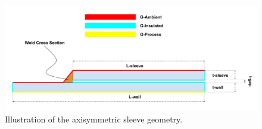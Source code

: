 \begin{figure}
\centerline{
\includegraphics[width=24cm]{img/geometry.png}
}
\caption{Illustration of the axisymmetric sleeve geometry.}
\label{fig:fig1}
\end{figure}